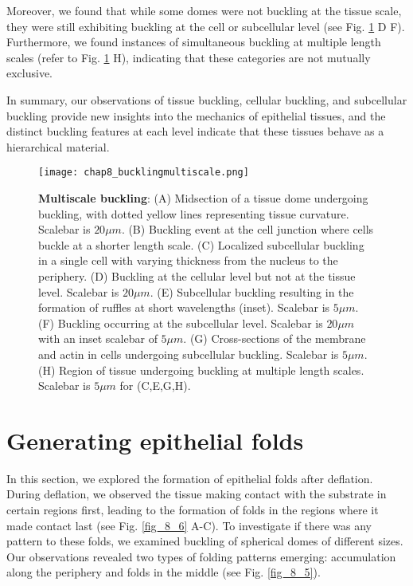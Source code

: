 Moreover, we found that while some domes were not buckling at the tissue scale, they were still exhibiting buckling at the cell or subcellular level (see Fig.  \ref{fig_8_4} D F). Furthermore, we found instances of simultaneous buckling at multiple length scales (refer to Fig. \ref{fig_8_4} H), indicating that these categories are not mutually exclusive.

In summary, our observations of tissue buckling, cellular buckling, and subcellular buckling provide new insights into the mechanics of epithelial tissues, and the distinct buckling features at each level indicate that these tissues behave as a hierarchical material.

\begin{figure}[]
	\centering
	\texttt{[image: chap8\_bucklingmultiscale.png]}
	\caption{\label{fig_8_4} \textbf{Multiscale buckling}: (A) Midsection of a tissue dome undergoing buckling, with dotted yellow lines representing tissue curvature. Scalebar is $20\mu m$. (B) Buckling event at the cell junction where cells buckle at a shorter length scale. (C) Localized subcellular buckling in a single cell with varying thickness from the nucleus to the periphery. (D) Buckling at the cellular level but not at the tissue level. Scalebar is $20\mu m$. (E) Subcellular buckling resulting in the formation of ruffles at short wavelengths (inset). Scalebar is $5 \mu m$. (F) Buckling occurring at the subcellular level. Scalebar is $20\mu m$ with an inset scalebar of $5 \mu m$. (G) Cross-sections of the membrane and actin in cells undergoing subcellular buckling. Scalebar is $5\mu m$. (H) Region of tissue undergoing buckling at multiple length scales. Scalebar is $5\mu m$ for (C,E,G,H).}
\end{figure}

\hypertarget{generating-epithelial-folds}{%
	\section{Generating epithelial
		folds}\label{generating-epithelial-folds}}

In this section, we explored the formation of epithelial folds after deflation. During deflation, we observed the tissue making contact with the substrate in certain regions first, leading to the formation of folds in the regions where it made contact last (see Fig. \ref{fig_8_6} A-C). To investigate if there was any pattern to these folds, we examined buckling of spherical domes of different sizes. Our observations revealed two types of folding patterns emerging: accumulation along the periphery and folds in the middle (see Fig. \ref{fig_8_5}).

